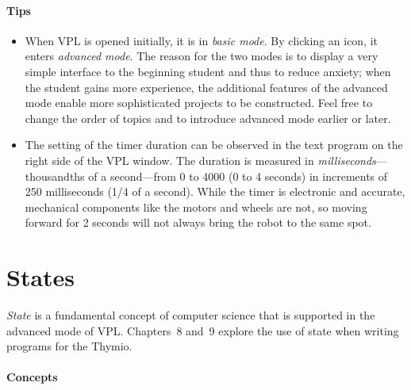 \documentclass[11pt,a4paper,english]{article}
\begin{document}
\paragraph{Tips}
\begin{itemize}

\item When VPL is opened initially, it is in \emph{basic mode}. By
clicking an icon, it enters \emph{advanced mode}. The reason for the two
modes is to display a very simple interface to the beginning student and
thus to reduce anxiety; when the student gains more experience, the
additional features of the advanced mode enable more sophisticated
projects to be constructed. Feel free to change the order of topics and
to introduce advanced mode earlier or later.

\item The setting of the timer duration can be observed in the text
program on the right side of the VPL window. The duration is measured in
\emph{milliseconds}---thousandths of a second---from 0 to 4000 (0 to 4
seconds) in increments of 250 milliseconds (1/4 of a second). While the
timer is electronic and accurate, mechanical components like the motors
and wheels are not, so moving forward for 2 seconds will not always
bring the robot to the same spot.

\end{itemize}


\section{States}

\emph{State} is a fundamental concept of computer science that is
supported in the advanced mode of VPL. Chapters~8 and~9 explore the use
of state when writing programs for the Thymio.

\paragraph{Concepts}
\end{document}

